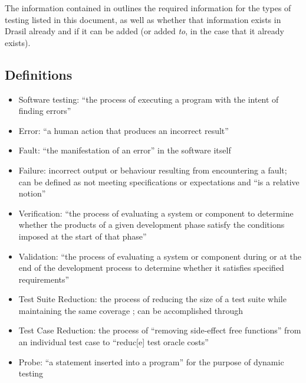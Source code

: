 The information contained in  outlines the required
information for the types of testing listed in this document, as well as
whether that information exists in Drasil already and if it can be added
(or added \emph{to}, in the case that it already exists).

\testReqsTable{}

\subsection{Definitions}

\begin{itemize}
      \item Software testing: ``the process of executing a program with the
            intent of finding errors'' \cite[p.~438]{peters_software_2000}
      \item Error: ``a human action that produces an incorrect result''
            \cite[p.~399]{van_vliet_software_2000}
      \item Fault: ``the manifestation of an error'' in the software itself
            \cite[p.~400]{van_vliet_software_2000}
      \item Failure: incorrect output or behaviour resulting from encountering
            a fault; can be defined as not meeting specifications or
            expectations and ``is a relative notion''
            \cite[p.~400]{van_vliet_software_2000}
      \item Verification: ``the process of evaluating a system or component
            to determine whether the products of a given development phase
            satisfy the conditions imposed at the start of that phase''
            \cite[p.~400]{van_vliet_software_2000}
      \item Validation: ``the process of evaluating a system or component
            during or at the end of the development process to determine
            whether it satisfies specified requirements''
            \cite[p.~400]{van_vliet_software_2000}
      \item Test Suite Reduction: the process of reducing the size of a test
            suite while maintaining the same coverage
            \cite[p.~519]{barr_oracle_2015}; can be accomplished through
      \item Test Case Reduction: the process of ``removing side-effect free
            functions'' from an individual test case to ``reduc[e] test oracle
            costs'' \cite[p.~519]{barr_oracle_2015}
      \item Probe: ``a statement inserted into a program'' for the purpose of
            dynamic testing \cite[p.~438]{peters_software_2000}
\end{itemize}

